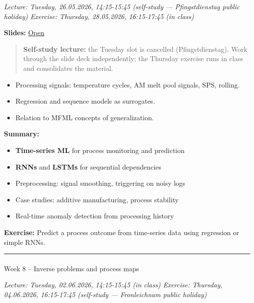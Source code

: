 \documentclass[
]{agujournal2019}
\makeatletter
\let\oldparagraph\paragraph
\renewcommand{\paragraph}{
    \@ifstar
      \xxxParagraphStar
      \xxxParagraphNoStar
  }
\newcommand{\xxxParagraphStar}[1]{\oldparagraph*{#1}\mbox{}}
\newcommand{\xxxParagraphNoStar}[1]{\oldparagraph{#1}\mbox{}}
\providecommand{\tightlist}{%
  \setlength{\itemsep}{0pt}\setlength{\parskip}{0pt}}
\makeatother
\begin{document}
\emph{Lecture: Tuesday, 26.05.2026, 14:15-15:45 (self-study ---
Pfingstdienstag public holiday) \textbar{} Exercise: Thursday,
28.05.2026, 16:15-17:45 (in class)}

\textbf{Slides:}
\href{https://pelzlab.science/public_presentations/ml_for_characterization_and_processing/unit07_time_series/01_intro.html}{Open}

\begin{quote}
\textbf{Self-study lecture:} the Tuesday slot is cancelled
(Pfingstdienstag). Work through the slide deck independently; the
Thursday exercise runs in class and consolidates the material.
\end{quote}

\begin{itemize}
\tightlist
\item
  Processing signals: temperature cycles, AM melt pool signals, SPS,
  rolling.
\item
  Regression and sequence models as surrogates.
\item
  Relation to MFML concepts of generalization.
\end{itemize}

\textbf{Summary:}

\begin{itemize}
\tightlist
\item
  \textbf{Time-series ML} for process monitoring and prediction
\item
  \textbf{RNNs} and \textbf{LSTMs} for sequential dependencies
\item
  Preprocessing: signal smoothing, triggering on noisy logs
\item
  Case studies: additive manufacturing, process stability
\item
  Real-time anomaly detection from processing history
\end{itemize}

\textbf{Exercise:} Predict a process outcome from time-series data using
regression or simple RNNs.

\begin{center}\rule{0.5\linewidth}{0.5pt}\end{center}

\paragraph{Week 8 -- Inverse problems and process
maps}\label{week-8-inverse-problems-and-process-maps}

\emph{Lecture: Tuesday, 02.06.2026, 14:15-15:45 (in class) \textbar{}
Exercise: Thursday, 04.06.2026, 16:15-17:45 (self-study --- Fronleichnam
public holiday)}
\end{document}
